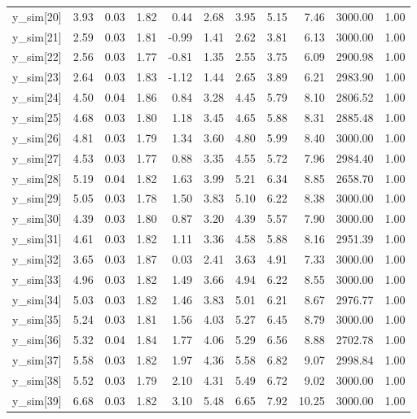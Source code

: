 \begin{table}[ht]
\begin{tabular}{rrrrrrrrrrr}
  y\_sim[20] & 3.93 & 0.03 & 1.82 & 0.44 & 2.68 & 3.95 & 5.15 & 7.46 & 3000.00 & 1.00 \\ 
  y\_sim[21] & 2.59 & 0.03 & 1.81 & -0.99 & 1.41 & 2.62 & 3.81 & 6.13 & 3000.00 & 1.00 \\ 
  y\_sim[22] & 2.56 & 0.03 & 1.77 & -0.81 & 1.35 & 2.55 & 3.75 & 6.09 & 2900.98 & 1.00 \\ 
  y\_sim[23] & 2.64 & 0.03 & 1.83 & -1.12 & 1.44 & 2.65 & 3.89 & 6.21 & 2983.90 & 1.00 \\ 
  y\_sim[24] & 4.50 & 0.04 & 1.86 & 0.84 & 3.28 & 4.45 & 5.79 & 8.10 & 2806.52 & 1.00 \\ 
  y\_sim[25] & 4.68 & 0.03 & 1.80 & 1.18 & 3.45 & 4.65 & 5.88 & 8.31 & 2885.48 & 1.00 \\ 
  y\_sim[26] & 4.81 & 0.03 & 1.79 & 1.34 & 3.60 & 4.80 & 5.99 & 8.40 & 3000.00 & 1.00 \\ 
  y\_sim[27] & 4.53 & 0.03 & 1.77 & 0.88 & 3.35 & 4.55 & 5.72 & 7.96 & 2984.40 & 1.00 \\ 
  y\_sim[28] & 5.19 & 0.04 & 1.82 & 1.63 & 3.99 & 5.21 & 6.34 & 8.85 & 2658.70 & 1.00 \\ 
  y\_sim[29] & 5.05 & 0.03 & 1.78 & 1.50 & 3.83 & 5.10 & 6.22 & 8.38 & 3000.00 & 1.00 \\ 
  y\_sim[30] & 4.39 & 0.03 & 1.80 & 0.87 & 3.20 & 4.39 & 5.57 & 7.90 & 3000.00 & 1.00 \\ 
  y\_sim[31] & 4.61 & 0.03 & 1.82 & 1.11 & 3.36 & 4.58 & 5.88 & 8.16 & 2951.39 & 1.00 \\ 
  y\_sim[32] & 3.65 & 0.03 & 1.87 & 0.03 & 2.41 & 3.63 & 4.91 & 7.33 & 3000.00 & 1.00 \\ 
  y\_sim[33] & 4.96 & 0.03 & 1.82 & 1.49 & 3.66 & 4.94 & 6.22 & 8.55 & 3000.00 & 1.00 \\ 
  y\_sim[34] & 5.03 & 0.03 & 1.82 & 1.46 & 3.83 & 5.01 & 6.21 & 8.67 & 2976.77 & 1.00 \\ 
  y\_sim[35] & 5.24 & 0.03 & 1.81 & 1.56 & 4.03 & 5.27 & 6.45 & 8.79 & 3000.00 & 1.00 \\ 
  y\_sim[36] & 5.32 & 0.04 & 1.84 & 1.77 & 4.06 & 5.29 & 6.56 & 8.88 & 2702.78 & 1.00 \\ 
  y\_sim[37] & 5.58 & 0.03 & 1.82 & 1.97 & 4.36 & 5.58 & 6.82 & 9.07 & 2998.84 & 1.00 \\ 
  y\_sim[38] & 5.52 & 0.03 & 1.79 & 2.10 & 4.31 & 5.49 & 6.72 & 9.02 & 3000.00 & 1.00 \\ 
  y\_sim[39] & 6.68 & 0.03 & 1.82 & 3.10 & 5.48 & 6.65 & 7.92 & 10.25 & 3000.00 & 1.00 \\ 

\end{tabular}
\end{table}
